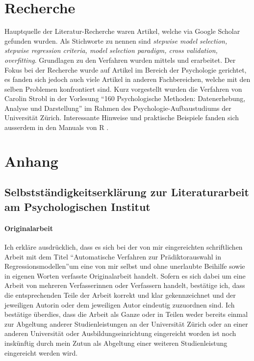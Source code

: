 \documentclass[german,12pt,doc]{apa}
\begin{document}
\section{Recherche}
Hauptquelle der Literatur-Recherche waren Artikel, welche via Google Scholar gefunden wurden. Als Stichworte zu nennen sind \textit{stepwise model selection, stepwise regression criteria, model selection paradigm, cross validation, overfitting}. Grundlagen zu den Verfahren wurden mittels  und  erarbeitet. Der Fokus bei der Recherche wurde auf Artikel im Bereich der Psychologie gerichtet, es fanden sich jedoch auch  viele Artikel in anderen Fachbereichen, welche mit den selben Problemen konfrontiert sind. Kurz vorgestellt wurden die Verfahren von Carolin Strobl in der Vorlesung ``160 Psychologische Methoden: Datenerhebung, Analyse und Darstellung'' im Rahmen des Psychologie-Aufbaustudiums der Universität Zürich. Interessante Hinweise und praktische Beispiele fanden sich ausserdem in den Manuals von R \cite{R:core}.









\newpage
\printglossaries 
\newpage
 



\newpage
\section{Anhang}
\subsection*{Selbstständigkeitserklärung zur Literaturarbeit am  Psychologischen Institut}
\paragraph{Originalarbeit}
Ich erkläre ausdrücklich, dass es sich bei der von mir eingereichten schriftlichen Arbeit 
mit dem Titel ``Automatische Verfahren zur Prädiktorauswahl in Regressionsmodellen''um eine von mir selbst und ohne unerlaubte Beihilfe sowie in eigenen Worten verfasste 
Originalarbeit handelt. 
Sofern es sich dabei um eine Arbeit von mehreren Verfasserinnen oder Verfassern handelt, bestätige ich, dass die entsprechenden Teile der Arbeit korrekt und klar gekennzeichnet und der jeweiligen Autorin oder dem jeweiligen Autor eindeutig zuzuordnen sind.
Ich bestätige überdies, dass die Arbeit als Ganze oder in Teilen weder bereits einmal zur Abgeltung anderer Studienleistungen an der Universität Zürich oder an einer anderen Universität oder Ausbildungseinrichtung eingereicht worden ist noch inskünftig durch mein Zutun als Abgeltung einer weiteren Studienleistung eingereicht werden wird. 
 
\end{document}
